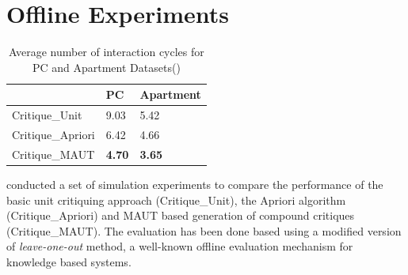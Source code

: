 \section{Offline Experiments}
\label{sec:offline}

\begin{table}
\caption{Average number of interaction cycles for PC and Apartment Datasets(\cite{mautPaper})}
\centering
\renewcommand{\arraystretch}{1.2}
\label{tab:paperResults}

\begin{tabular}{|p{5cm}|p{3cm}|p{3cm}|}
\hline
& PC & Apartment \\
\hline
Critique\_Unit & 9.03 & 5.42 \\
\hline
Critique\_Apriori & 6.42  & 4.66\\
\hline
Critique\_MAUT & \textbf{4.70} & \textbf{3.65}\\
\hline

\end{tabular}
\end{table}


\cite{mautPaper} conducted a set of simulation experiments to compare the performance of the basic unit critiquing approach (Critique\_Unit), the Apriori algorithm (Critique\_Apriori) and MAUT based generation of compound critiques (Critique\_MAUT).
The evaluation has been done based using a modified version of \textit{leave-one-out} method, a well-known offline evaluation mechanism for knowledge based systems.

